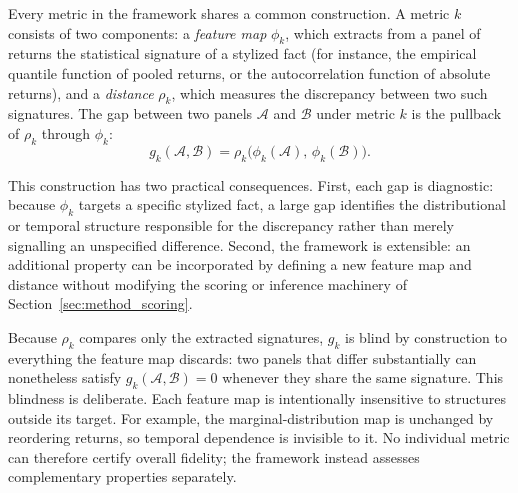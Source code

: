 Every metric in the framework shares a common construction.
A metric $k$ consists of two components: a \emph{feature map} $\phi_k$,
which extracts from a panel of returns the statistical signature of a
stylized fact (for instance, the empirical quantile function of pooled
returns, or the autocorrelation function of absolute returns), and a
\emph{distance} $\rho_k$, which measures the discrepancy between two
such signatures.
The gap between two panels $\mathcal{A}$ and $\mathcal{B}$ under metric
$k$ is the pullback of $\rho_k$ through $\phi_k$:
\begin{equation}
  g_k(\mathcal{A}, \mathcal{B})
  = \rho_k\bigl(\phi_k(\mathcal{A}),\, \phi_k(\mathcal{B})\bigr).
  \label{eq:pullback}
\end{equation}

This construction has two practical consequences.
First, each gap is diagnostic: because $\phi_k$ targets a specific
stylized fact, a large gap identifies the distributional or temporal
structure responsible for the discrepancy rather than merely signalling
an unspecified difference.
Second, the framework is extensible: an additional property can be
incorporated by defining a new feature map and distance without modifying
the scoring or inference machinery of
Section~\ref{sec:method_scoring}.

Because $\rho_k$ compares only the extracted signatures, $g_k$ is blind
by construction to everything the feature map discards: two panels that
differ substantially can nonetheless satisfy
$g_k(\mathcal{A}, \mathcal{B}) = 0$ whenever they share the same
signature.
This blindness is deliberate.
Each feature map is intentionally insensitive to structures outside its
target.
For example, the marginal-distribution map is unchanged by reordering
returns, so temporal dependence is invisible to it.
No individual metric can therefore certify overall fidelity; the
framework instead assesses complementary properties separately.

